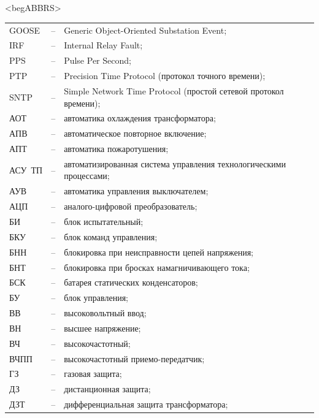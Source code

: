 \color{unimain}\section*{}
{\color{white}\fontsize{0.1pt}{0.1pt}\selectfont<begABBRS>}
\color{black}
\begin{longtable}{>{\raggedright\arraybackslash}m{2cm}>{\raggedright\arraybackslash}m{0.5cm}>{\raggedright\arraybackslash}m{20cm}}
\endfirsthead\endhead\endfoot\endlastfoot
GOOSE & -- & Generic Object-Oriented Substation Event; \\
IRF & -- & Internal Relay Fault; \\
PPS & -- & Pulse Per Second; \\
PTP & -- & Precision Time Protocol (протокол точного времени); \\
SNTP & -- & Simple Network Time Protocol (простой сетевой протокол времени); \\
АОТ & -- & автоматика охлаждения трансформатора; \\
АПВ & -- & автоматическое повторное включение; \\
АПТ & -- & автоматика пожаротушения; \\
АСУ~ТП & -- & автоматизированная система управления технологическими процессами; \\
АУВ & -- & автоматика управления выключателем; \\
АЦП & -- & аналого-цифровой преобразователь; \\
БИ & -- & блок испытательный; \\
БКУ & -- & блок команд управления; \\
БНН & -- & блокировка при неисправности цепей напряжения; \\
БНТ & -- & блокировка при бросках намагничивающего тока; \\
БСК & -- & батарея статических конденсаторов; \\
БУ & -- & блок управления; \\
ВВ & -- & высоковольтный ввод; \\
ВН & -- & высшее напряжение; \\
ВЧ & -- & высокочастотный; \\
ВЧПП & -- & высокочастотный приемо-передатчик; \\
ГЗ & -- & газовая защита; \\
ДЗ & -- & дистанционная защита; \\
ДЗТ & -- & дифференциальная защита трансформатора; \\

\end{longtable}
